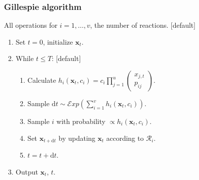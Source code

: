 \documentclass{beamer}
\newcommand{\bx}{\bm{x}}
\newcommand{\dx}[1]{\mathrm{d}{#1}}
\begin{document}
    \begin{frame}[noframenumbering]
    \frametitle{Gillespie algorithm}
    All operations for $i = 1, \ldots, v$, the number of reactions.
    [default]
    \begin{enumerate}
        \item Set  $t = 0$, initialize $\bx_t$.
        \item While $t \leq T$:
        [default]
        \begin{enumerate}
            \item Calculate $\displaystyle h_i(\bx_t, c_i) = c_i \prod_{j=1}^u \begin{pmatrix}
            x_{j,t} \\
            p_{ij}
            \end{pmatrix}$.
            \item Sample $\dx{t} \sim \mathcal{E}\mathit{xp}(\sum_{i=1}^v h_i(\bx_t, c_i))$.
            \item Sample $i$ with probability $\propto h_i(\bx_t, c_i)$.
            \item Set $\bx_{t+\dx{t}}$ by updating $\bx_t$ according to $\mathcal{R}_i$.
            \item $t = t + \dx{t}$.
        \end{enumerate}
        \item Output $\bx_t$, $t$.
    \end{enumerate}
    \end{frame}
\end{document}
